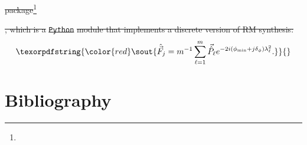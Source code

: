 \documentclass[11pt, a4paper]{book}
\providecommand{\DIFdeltex}[1]{{\protect\color{red}\sout{#1}}}                      %
\providecommand{\DIFdelend}{} %
\providecommand{\DIFdel}[1]{\texorpdfstring{\DIFdeltex{#1}}{}} %
\DeclareRobustCommand{\DIFdelend}{\DIFOaddend \let\includegraphics\DIFOincludegraphics} %
\begin{document}
\DIFdel{package}\footnote{%
}%
\addtocounter{footnote}{-1}%
\DIFdel{, which is a }\texttt{\DIFdel{Python}} %
\DIFdel{module that implements a discrete version of RM synthesis:
    }\begin{displaymath}
      \DIFdel{%
      \hat{\vec{F}}_j = m^{-1} \sum_{\ell = 1}^m \vec{\hat P}_\ell e^{-2i(\phi_{\min} + j\delta_\phi)\lambda^2_\ell}.
    }\end{displaymath}%
\DIFdelend %



\backmatter

\chapter{Bibliography}
\printbibliography[heading=none]
% 
% 

\printindex
\end{document}
